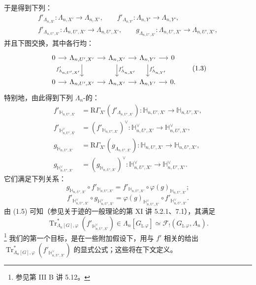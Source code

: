 于是得到下列：
\[
\begin{gathered}
f'_{\Lambda_{n,X'}}:\Lambda_{n,X'}\longrightarrow\Lambda_{n,X'},\qquad
f'_{\Lambda_{n,Y'}}:\Lambda_{n,Y'}\longrightarrow\Lambda_{n,Y'},\\
f'_{\Lambda_{n,U',X'}}:\Lambda_{n,U',X'}\longrightarrow\Lambda_{n,U',X'},\qquad
g_{\Lambda_{n,U',X'}}:\Lambda_{n,U',X'}\longrightarrow\Lambda_{n,U',X'},
\end{gathered}
\]
并且下图交换，其中各行均：
\[
\begin{tikzcd}[column sep=small]
0\arrow[r]&\Lambda_{n,U',X'}\arrow[r]\arrow[d,"{f'_{\Lambda_{n,U',X'}}}"']&\Lambda_{n,X'}\arrow[r]\arrow[d,"{f'_{\Lambda_{n,X'}}}"]&\Lambda_{n,Y'}\arrow[r]\arrow[d,"{f'_{\Lambda_{n,Y'}}}"]&0\\
0\arrow[r]&\Lambda_{n,U',X'}\arrow[r]&\Lambda_{n,X'}\arrow[r]&\Lambda_{n,Y'}\arrow[r]&0.
\end{tikzcd}
\tag{1.3}
\]
特别地，由此得到下列 $\Lambda_n$-的：
\[
\begin{aligned}
f'_{\mathbb H_{n,U',X'}}
 &=\mathrm R\Gamma_{X'}(f'_{\Lambda_{n,U',X'}}):
 \mathbb H_{n,U',X'}\longrightarrow\mathbb H_{n,U',X'},\\
f'_{\mathbb H_{n,U',X'}^\vee}
 &=(f'_{\mathbb H_{n,U',X'}})^\vee:
 \mathbb H_{n,U',X'}^\vee\longrightarrow\mathbb H_{n,U',X'}^\vee,\\
g_{\mathbb H_{n,U',X'}}
 &=\mathrm R\Gamma_{X'}(g_{\Lambda_{n,U',X'}}):
 \mathbb H_{n,U',X'}\longrightarrow\mathbb H_{n,U',X'},\\
g_{\mathbb H_{n,U',X'}^\vee}
 &=(g_{\mathbb H_{n,U',X'}})^\vee:
 \mathbb H_{n,U',X'}^\vee\longrightarrow\mathbb H_{n,U',X'}^\vee.
\end{aligned}
\]
它们满足下列关系：
\[
g_{\mathbb H_{n,U',X'}}\circ f'_{\mathbb H_{n,U',X'}}
=f'_{\mathbb H_{n,U',X'}}\circ\varphi(g)_{\mathbb H_{n,U',X'}};
\tag{1.4}
\]
\[
f'_{\mathbb H_{n,U',X'}^\vee}\circ g_{\mathbb H_{n,U',X'}^\vee}
=\varphi(g)_{\mathbb H_{n,U',X'}^\vee}\circ f'_{\mathbb H_{n,U',X'}^\vee}.
\tag{1.5}
\]
由 (1.5) 可知（参见关于迹的一般理论的第 XI 讲 5.2.1、7.1），其满足
\[
\operatorname{Tr}^{*}_{\Lambda_n[G],\varphi}
 (f'_{\mathbb H_{n,U',X'}^\vee})
\in\Lambda_n[G_{\natural,\varphi}]
\simeq\mathscr F_!(G_{\natural,\varphi},\Lambda_n).
\]
\footnote{参见第 III B 讲 5.12。}
我们的第一个目标，是在一些附加假设下，用与 $f'$ 相关的给出
$\operatorname{Tr}^{*}_{\Lambda_n[G],\varphi}(f'_{\mathbb H_{n,U',X'}^\vee})$ 的显式公式；这些将在下文定义。

